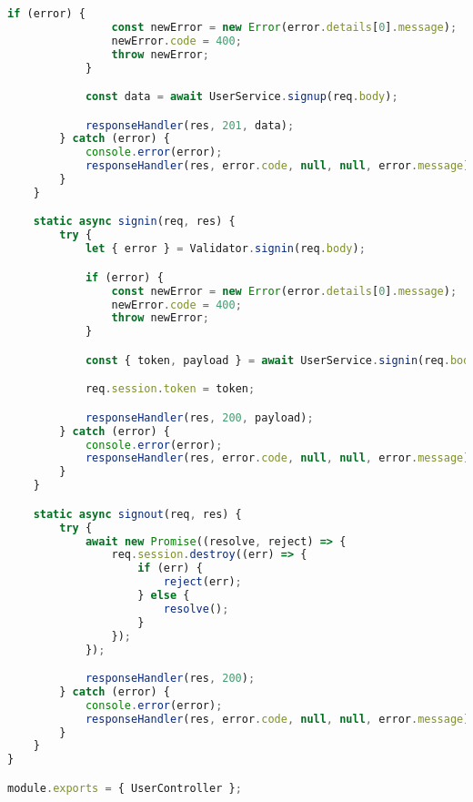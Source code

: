 \begin{lstlisting}[language=Javascript,caption={User Controller}]
			if (error) {
				const newError = new Error(error.details[0].message);
				newError.code = 400;
				throw newError;
			}

			const data = await UserService.signup(req.body);

			responseHandler(res, 201, data);
		} catch (error) {
			console.error(error);
			responseHandler(res, error.code, null, null, error.message);
		}
	}

	static async signin(req, res) {
		try {
			let { error } = Validator.signin(req.body);

			if (error) {
				const newError = new Error(error.details[0].message);
				newError.code = 400;
				throw newError;
			}

			const { token, payload } = await UserService.signin(req.body);

			req.session.token = token;

			responseHandler(res, 200, payload);
		} catch (error) {
			console.error(error);
			responseHandler(res, error.code, null, null, error.message);
		}
	}

	static async signout(req, res) {
		try {
			await new Promise((resolve, reject) => {
				req.session.destroy((err) => {
					if (err) {
						reject(err);
					} else {
						resolve();
					}
				});
			});

			responseHandler(res, 200);
		} catch (error) {
			console.error(error);
			responseHandler(res, error.code, null, null, error.message);
		}
	}
}

module.exports = { UserController };
\end{lstlisting}